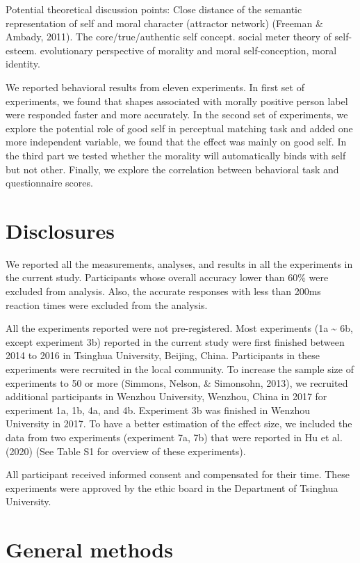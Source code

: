 \documentclass[
  english,
  man]{apa6}
\begin{document}
Potential theoretical discussion points:
Close distance of the semantic representation of self and moral character (attractor network) (Freeman \& Ambady, 2011).
The core/true/authentic self concept.
social meter theory of self-esteem.
evolutionary perspective of morality and moral self-conception, moral identity.

We reported behavioral results from eleven experiments. In first set of experiments, we found that shapes associated with morally positive person label were responded faster and more accurately. In the second set of experiments, we explore the potential role of good self in perceptual matching task and added one more independent variable, we found that the effect was mainly on good self. In the third part we tested whether the morality will automatically binds with self but not other. Finally, we explore the correlation between behavioral task and questionnaire scores.

\hypertarget{disclosures}{%
\section{Disclosures}\label{disclosures}}

We reported all the measurements, analyses, and results in all the experiments in the current study. Participants whose overall accuracy lower than 60\% were excluded from analysis. Also, the accurate responses with less than 200ms reaction times were excluded from the analysis.

All the experiments reported were not pre-registered. Most experiments (1a \textasciitilde{} 6b, except experiment 3b) reported in the current study were first finished between 2014 to 2016 in Tsinghua University, Beijing, China. Participants in these experiments were recruited in the local community. To increase the sample size of experiments to 50 or more (Simmons, Nelson, \& Simonsohn, 2013), we recruited additional participants in Wenzhou University, Wenzhou, China in 2017 for experiment 1a, 1b, 4a, and 4b. Experiment 3b was finished in Wenzhou University in 2017. To have a better estimation of the effect size, we included the data from two experiments (experiment 7a, 7b) that were reported in Hu et al. (2020) (See Table S1 for overview of these experiments).

All participant received informed consent and compensated for their time. These experiments were approved by the ethic board in the Department of Tsinghua University.

\hypertarget{general-methods}{%
\section{General methods}\label{general-methods}}
\end{document}
